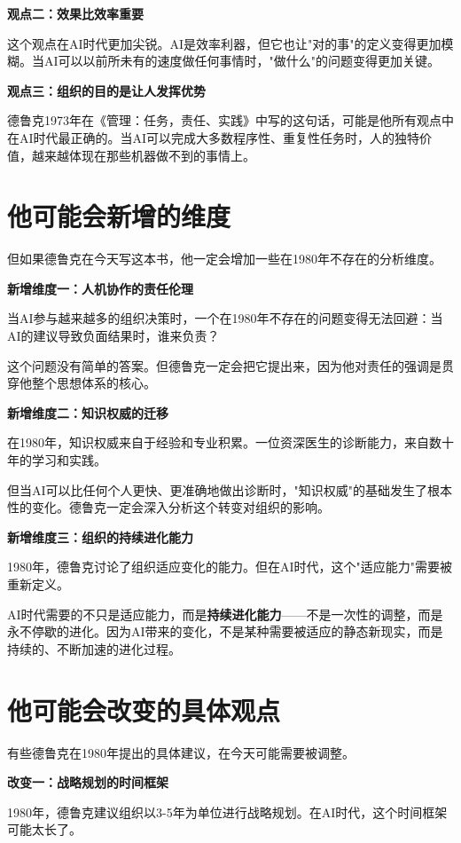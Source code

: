 \textbf{观点二：效果比效率重要}

这个观点在AI时代更加尖锐。AI是效率利器，但它也让"对的事"的定义变得更加模糊。当AI可以以前所未有的速度做任何事情时，"做什么"的问题变得更加关键。

\textbf{观点三：组织的目的是让人发挥优势}

德鲁克1973年在《管理：任务，责任、实践》中写的这句话，可能是他所有观点中在AI时代最正确的。当AI可以完成大多数程序性、重复性任务时，人的独特价值，越来越体现在那些机器做不到的事情上。

\section{他可能会新增的维度}


但如果德鲁克在今天写这本书，他一定会增加一些在1980年不存在的分析维度。

\textbf{新增维度一：人机协作的责任伦理}

当AI参与越来越多的组织决策时，一个在1980年不存在的问题变得无法回避：当AI的建议导致负面结果时，谁来负责？

这个问题没有简单的答案。但德鲁克一定会把它提出来，因为他对责任的强调是贯穿他整个思想体系的核心。

\textbf{新增维度二：知识权威的迁移}

在1980年，知识权威来自于经验和专业积累。一位资深医生的诊断能力，来自数十年的学习和实践。

但当AI可以比任何个人更快、更准确地做出诊断时，"知识权威"的基础发生了根本性的变化。德鲁克一定会深入分析这个转变对组织的影响。

\textbf{新增维度三：组织的持续进化能力}

1980年，德鲁克讨论了组织适应变化的能力。但在AI时代，这个"适应能力"需要被重新定义。

AI时代需要的不只是适应能力，而是\textbf{持续进化能力}——不是一次性的调整，而是永不停歇的进化。因为AI带来的变化，不是某种需要被适应的静态新现实，而是持续的、不断加速的进化过程。

\section{他可能会改变的具体观点}


有些德鲁克在1980年提出的具体建议，在今天可能需要被调整。

\textbf{改变一：战略规划的时间框架}

1980年，德鲁克建议组织以3-5年为单位进行战略规划。在AI时代，这个时间框架可能太长了。


